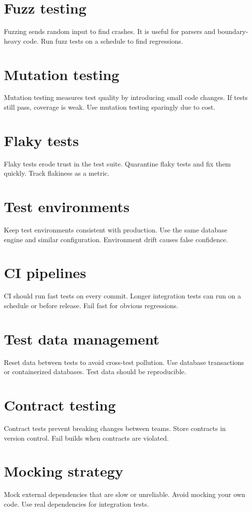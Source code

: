 \section{Fuzz testing}
Fuzzing sends random input to find crashes.
It is useful for parsers and boundary-heavy code.
Run fuzz tests on a schedule to find regressions.

\section{Mutation testing}
Mutation testing measures test quality by introducing small code changes.
If tests still pass, coverage is weak.
Use mutation testing sparingly due to cost.

\section{Flaky tests}
Flaky tests erode trust in the test suite.
Quarantine flaky tests and fix them quickly.
Track flakiness as a metric.

\section{Test environments}
Keep test environments consistent with production.
Use the same database engine and similar configuration.
Environment drift causes false confidence.

\section{CI pipelines}
CI should run fast tests on every commit.
Longer integration tests can run on a schedule or before release.
Fail fast for obvious regressions.

\section{Test data management}
Reset data between tests to avoid cross-test pollution.
Use database transactions or containerized databases.
Test data should be reproducible.

\section{Contract testing}
Contract tests prevent breaking changes between teams.
Store contracts in version control.
Fail builds when contracts are violated.

\section{Mocking strategy}
Mock external dependencies that are slow or unreliable.
Avoid mocking your own code.
Use real dependencies for integration tests.

